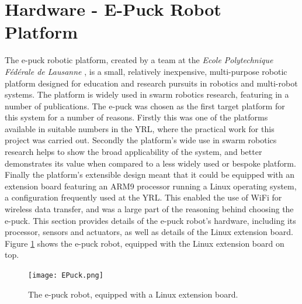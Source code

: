 \section{Hardware - E-Puck Robot Platform}
The e-puck robotic platform, created by a team at the \textit{Ecole Polytechnique Fédérale de Lausanne} \cite{epuck}, is a small, relatively inexpensive, multi-purpose robotic platform designed for education and research pursuits in robotics and multi-robot systems. The platform is widely used in swarm robotics research, featuring in a number of publications. The e-puck was chosen as the first target platform for this system for a number of reasons. Firstly this was one of the platforms available in suitable numbers in the YRL, where the practical work for this project was carried out. Secondly the platform's wide use in swarm robotics research helps to show the broad applicability of the system, and better demonstrates its value when compared to a less widely used or bespoke platform. Finally the platform's extensible design meant that it could be equipped with an extension board featuring an ARM9 processor running a Linux operating system, a configuration frequently used at the YRL. This enabled the use of WiFi for wireless data transfer, and was a large part of the reasoning behind choosing the e-puck. This section provides details of the e-puck robot's hardware, including its processor, sensors and actuators, as well as details of the Linux extension board. Figure \ref{fig:EPuck} shows the e-puck robot, equipped with the Linux extension board on top.

\begin{figure}
	\begin{center}
	\texttt{[image: EPuck.png]}
	\decoRule
	\caption[The e-puck Robot]{The e-puck robot, equipped with a Linux extension board.}
	\label{fig:EPuck}
	\end{center}
\end{figure}


